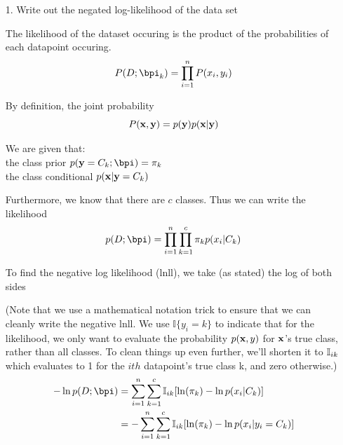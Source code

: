 \documentclass[submit]{harvardml}
\newenvironment{answer}{%
    \color{answergreen}\bf}
  {%
  }
\begin{document}
\begin{enumerate}
    \item[1.] Write out the negated log-likelihood of the data set

    \begin{answer}

        The likelihood of the dataset occuring is the product of the
        probabilities of each datapoint occuring.
        $$P(D;\bpi_k) = \prod_{i=1}^n P(x_i, y_i)$$

        By definition, the joint probability
        $$P(\mathbf{x},\mathbf{y}) = p(\mathbf{y}) p(\mathbf{x}|\mathbf{y})$$


        We are given that:  \\
        the class prior $p(\by=C_k; \bpi) = \pi_k$  \\
        the class conditional $p(\mathbf{x}|\mathbf{y} = C_k)$ 

        Furthermore, we know that there are $c$ classes.  Thus we can write the likelihood 
        $$p(D; \bpi) = \prod_{i=1}^n \prod_{k=1}^c \pi_k p(x_i | C_k)$$
       
        To find the negative log likelihood (lnll), we take (as stated) the
        log of both sides

        (Note that we use a mathematical notation trick to ensure that we can
        cleanly write the negative lnll. We use $\mathbb{I}\{y_i = k\}$ to indicate that
       for the likelihood, we only want to evaluate the probability $p( \mathbf{x}, y)$
        for $\mathbf{x}$'s true class, rather than all classes. To clean things up even
        further, we'll shorten it to $\mathbb{I}_{ik}$ which evaluates to 1 for the $ith$ datapoint's true class k, and zero
        otherwise.)
        \begin{align}
            - \ln p(D; \bpi) &=  \sum_{i=1}^n \sum_{k=1}^c \mBI 
                 [\ln(\pi_k) - \ln p(x_i|C_k) ]\\
                &= - \sum_{i=1}^n \sum_{k=1}^c \mBI [
                    \ln(\pi_k) - \ln p(x_i| y_i = C_k) ]  \label{lnLL}
        \end{align}
    \end{answer}


\end{enumerate}
\end{document}
